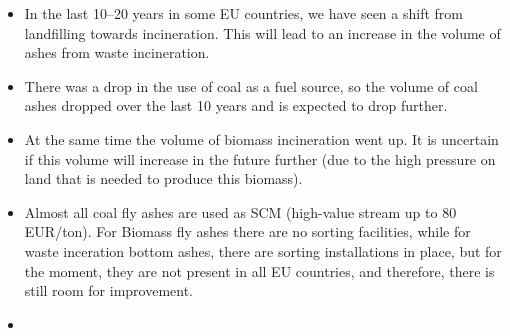 \begin{itemize}
  \item In the last 10--20 years in some EU countries, we have seen a shift from landfilling towards incineration. This will lead to an increase in the volume of ashes from waste incineration.
  \item There was a drop in the use of coal as a fuel source, so the volume of coal ashes dropped over the last 10 years and is expected to drop further. 
  \item At the same time the volume of biomass incineration went up. It is uncertain if this volume will increase in the future further (due to the high pressure on land that is needed to produce this biomass).
  \item Almost all coal fly ashes are used as SCM (high-value stream up to 80 EUR/ton). 
  For Biomass fly ashes there are no sorting facilities, while for waste inceration bottom ashes, there are sorting installations in place, but for the moment, they are not present in all EU  countries, and therefore, there is still room for improvement. 
  \item 
\end{itemize}




